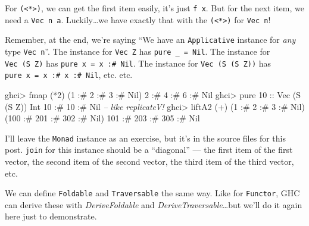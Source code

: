 \documentclass[]{article}
\newenvironment{Shaded}{}{}
\newcommand{\DataTypeTok}[1]{\textcolor[rgb]{0.56,0.13,0.00}{{#1}}}
\newcommand{\DecValTok}[1]{\textcolor[rgb]{0.25,0.63,0.44}{{#1}}}
\newcommand{\CommentTok}[1]{\textcolor[rgb]{0.38,0.63,0.69}{\textit{{#1}}}}
\newcommand{\OtherTok}[1]{\textcolor[rgb]{0.00,0.44,0.13}{{#1}}}
\newcommand{\FunctionTok}[1]{\textcolor[rgb]{0.02,0.16,0.49}{{#1}}}
\newcommand{\NormalTok}[1]{{#1}}
\begin{document}
For \texttt{(\textless{}*\textgreater{})}, we can get the first item
easily, it's just \texttt{f\ x}. But for the next item, we need a
\texttt{Vec\ n\ a}. Luckily\ldots{}we have exactly that with the
\texttt{(\textless{}*\textgreater{})} for \texttt{Vec\ n}!

Remember, at the end, we're saying ``We have an \texttt{Applicative}
instance for \emph{any} type \texttt{Vec\ n}''. The instance for
\texttt{Vec\ Z} has \texttt{pure\ \_\ =\ Nil}. The instance for
\texttt{Vec\ (S\ Z)} has \texttt{pure\ x\ =\ x\ :\#\ Nil}. The instance
for \texttt{Vec\ (S\ (S\ Z))} has
\texttt{pure\ x\ =\ x\ :\#\ x\ :\#\ Nil}, etc. etc.

\begin{Shaded}
\begin{Highlighting}[]
\NormalTok{ghci}\FunctionTok{>} \NormalTok{fmap (}\FunctionTok{*}\DecValTok{2}\NormalTok{) (}\DecValTok{1} \FunctionTok{:#} \DecValTok{2} \FunctionTok{:#} \DecValTok{3} \FunctionTok{:#} \DataTypeTok{Nil}\NormalTok{)}
\DecValTok{2} \FunctionTok{:#} \DecValTok{4} \FunctionTok{:#} \DecValTok{6} \FunctionTok{:#} \DataTypeTok{Nil}
\NormalTok{ghci}\FunctionTok{>} \NormalTok{pure }\DecValTok{10}\OtherTok{ ::} \DataTypeTok{Vec} \NormalTok{(}\DataTypeTok{S} \NormalTok{(}\DataTypeTok{S} \DataTypeTok{Z}\NormalTok{)) }\DataTypeTok{Int}
\DecValTok{10} \FunctionTok{:#} \DecValTok{10} \FunctionTok{:#} \DataTypeTok{Nil}         \CommentTok{-- like replicateV!}
\NormalTok{ghci}\FunctionTok{>} \NormalTok{liftA2 (}\FunctionTok{+}\NormalTok{) (}\DecValTok{1} \FunctionTok{:#} \DecValTok{2} \FunctionTok{:#} \DecValTok{3} \FunctionTok{:#} \DataTypeTok{Nil}\NormalTok{) (}\DecValTok{100} \FunctionTok{:#} \DecValTok{201} \FunctionTok{:#} \DecValTok{302} \FunctionTok{:#} \DataTypeTok{Nil}\NormalTok{)}
\DecValTok{101} \FunctionTok{:#} \DecValTok{203} \FunctionTok{:#} \DecValTok{305} \FunctionTok{:#} \DataTypeTok{Nil}
\end{Highlighting}
\end{Shaded}

I'll leave the \texttt{Monad} instance as an exercise, but it's in the
source files for this post. \texttt{join} for this instance should be a
``diagonal'' --- the first item of the first vector, the second item of
the second vector, the third item of the third vector, etc.

We can define \texttt{Foldable} and \texttt{Traversable} the same way.
Like for \texttt{Functor}, GHC can derive these with
\emph{DeriveFoldable} and \emph{DeriveTraversable}\ldots{}but we'll do
it again here just to demonstrate.
\end{document}
